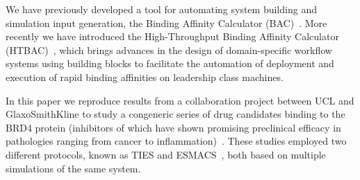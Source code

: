 
We have previously developed a tool for automating
system building and simulation input generation, the Binding Affinity
Calculator (BAC)~\cite{Sadiq2008}. More recently we have introduced the 
High-Throughput Binding Affinity Calculator (HTBAC)~\cite{dakka2017}, 
which brings advances in the design of domain-specific workflow systems 
using building blocks to facilitate the automation of deployment 
and execution of rapid binding affinities on leadership class machines. 










In this paper we reproduce results from a collaboration project between UCL
and GlaxoSmithKline to study a congeneric series of drug candidates binding to
the BRD4 protein (inhibitors of which have shown promising preclinical
efficacy in pathologies ranging from cancer to
inflammation)~\cite{Wan2017brd4}. These studies employed two different
protocols, known as TIES and ESMACS~\cite{Bhati2017}, both based on multiple
simulations of the same system. 

